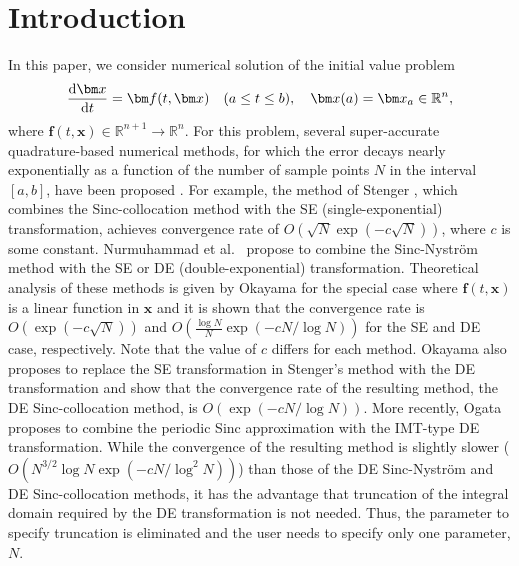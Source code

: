\documentclass[pdflatex,sn-mathphys-num]{sn-jnl}%
\theoremstyle{thmstyleone}%
\theoremstyle{thmstyletwo}%
\theoremstyle{thmstylethree}%
\begin{document}
\section{Introduction}
In this paper, we consider numerical solution of the initial value problem
\begin{equation}
\frac{{\rm d}{\bm x}}{{\rm d}t}={\bm f}(t,{\bm x}) \quad (a\le t\le b), \quad {\bm x}(a)={\bm x}_a \in\mathbb{R}^n,
\label{eq:ODE}
\end{equation}
where ${\bm f}(t,{\bm x})\in\mathbb{R}^{n+1}\rightarrow\mathbb{R}^n$. For this problem, several super-accurate quadrature-based numerical methods, for which the error decays nearly exponentially as a function of the number of sample points $N$ in the interval $[a,b]$, have been proposed \cite{Tanaka23,Stenger93,Nurmuhammad05,Okayama18,Ogata23}. For example, the method of Stenger \cite{Stenger93}, which combines the Sinc-collocation method with the SE (single-exponential) transformation, achieves convergence rate of $O(\sqrt{N}\exp(-c\sqrt{N}))$, where $c$ is some constant. Nurmuhammad et al.~\cite{Nurmuhammad05} propose to combine the Sinc-Nystr\"{o}m method with the SE or DE (double-exponential) transformation. Theoretical analysis of these methods is given by Okayama \cite{Okayama18} for the special case where ${\bm f}(t,{\bm x})$ is a linear function in ${\bm x}$ and it is shown that the convergence rate is $O(\exp(-c\sqrt{N}))$ and $O(\frac{\log N}{N}\exp(-cN/\log N))$ for the SE and DE case, respectively. Note that the value of $c$ differs for each method. Okayama \cite{Okayama18} also proposes to replace the SE transformation in Stenger's method with the DE transformation and show that the convergence rate of the resulting method, the DE Sinc-collocation method, is $O(\exp(-cN/\log N))$. More recently, Ogata \cite{Ogata23} proposes to combine the periodic Sinc approximation with the IMT-type DE transformation. While the convergence of the resulting method is slightly slower ($O(N^{3/2}\log N\exp(-cN/\log^2 N))$) than those of the DE Sinc-Nystr\"{o}m and DE Sinc-collocation methods, it has the advantage that truncation of the integral domain required by the DE transformation is not needed. Thus, the parameter to specify truncation is eliminated and the user needs to specify only one parameter, $N$.
\end{document}
